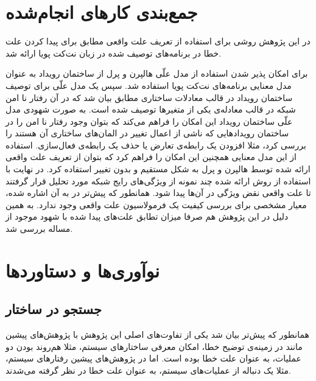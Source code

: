 \documentclass[
msc,
irfonts
]{./tex/tehran-thesis}
\newcommand{\پ}{پروژه/پایان‌نامه/رساله }
\theoremstyle{definition}
\theoremstyle{theorem}
\theoremstyle{definition}
\numberwithin{algorithm}{chapter}
\begin{document}
\section{جمع‌بندی کار‌های انجام‌شده}
 در این پژوهش روشی برای استفاده از تعریف علت واقعی مطابق
\cite{hp}
برای پیدا کردن علت خطا در برنامه‌های توصیف شده در زبان نت‌کت پویا ارائه شد.

برای امکان پذیر شدن استفاده از مدل علّی هالپرن و پرل از ساختمان رویداد به عنوان مدل معنایی برنامه‌های نت‌کت پویا استفاده شد.
سپس یک مدل علّی برای توصیف ساختمان رویداد در قالب معادلات ساختاری مطابق
\cite{hp}
بیان شد که در آن رفتار نا امن شبکه در قالب معادله‌ی یکی از متغیر‌ها توصیف شده است.
به صورت شهودی مدل علّی ساختمان رویداد این امکان را فراهم می‌کند که بتوان وجود رفتار نا امن را در ساختمان رویداد‌هایی که ناشی از اعمال تغییر در المان‌های ساختاری آن هستند را بررسی کرد، مثلا افزودن یک رابطه‌ی تعارض یا حذف یک رابطه‌ی فعال‌سازی.
استفاده از این مدل معنایی همچنین این امکان را فراهم کرد که بتوان از تعریف علت واقعی ارائه شده توسط هالپرن و پرل به شکل مستقیم و بدون تغییر استفاده کرد.
در نهایت با استفاده از روش ارائه شده چند نمونه از ویژگی‌های رایج شبکه مورد تحلیل قرار گرفتند تا علت واقعی نقض ویژگی در آن‌ها پیدا شود.
همانطور که پیش‌تر در 
\cite{hp}
به آن اشاره شده، معیار مشخصی برای بررسی کیفیت یک فرمولاسیون علت واقعی وجود ندارد.  
به همین دلیل در این پژوهش هم صرفا میزان تطابق علت‌های پیدا شده با شهود موجود از مساله بررسی شد.  

 \section{نوآوری‌ها و دستاورد‌ها}

 \subsection{جستجو در ساختار}
همانطور که پیش‌تر بیان شد یکی از تفاوت‌های اصلی این پژوهش با پژوهش‌های پیشین مانند
\cite{causality-checking,chockler,causal-hml}
در زمینه‌ی توضیح خطا، امکان معرفی ساختار‌های سیستم، مثلا هم‌روند بودن دو عملیات، به عنوان علت خطا بوده است.
اما در پژوهش‌های پیشین رفتار‌های سیستم، مثلا یک دنباله از عملیات‌های سیستم، به عنوان علت خطا در نظر گرفته می‌شدند.
\end{document}
